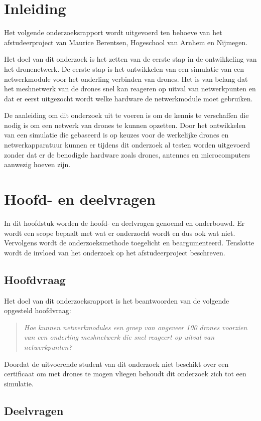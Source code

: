 \documentclass[a4paper, 11pt, oneside]{report}
\begin{document}
\chapter{Inleiding}
\label{chapter:inleiding}


Het volgende onderzoeksrapport wordt uitgevoerd ten behoeve van het afstudeerproject van Maurice Berentsen, Hogeschool van Arnhem en Nijmegen.

Het doel van dit onderzoek is het zetten van de eerste stap in de ontwikkeling van het dronenetwerk.
De eerste stap is het ontwikkelen van een simulatie van een netwerkmodule voor het onderling verbinden van drones.
Het is van belang dat het meshnetwerk van de drones snel kan reageren op uitval van netwerkpunten en dat er eerst uitgezocht wordt welke hardware de netwerkmodule moet gebruiken.

De aanleiding om dit onderzoek uit te voeren is om de kennis te verschaffen die nodig is om een netwerk van drones te kunnen opzetten.
Door het ontwikkelen van een simulatie die gebaseerd is op keuzes voor de werkelijke drones en netwerkapparatuur kunnen er tijdens dit onderzoek al testen worden uitgevoerd zonder dat er de benodigde hardware zoals drones, antennes en microcomputers aanwezig hoeven zijn. 


\chapter{Hoofd- en deelvragen}
In dit hoofdstuk worden de hoofd- en deelvragen genoemd en onderbouwd.
Er wordt een scope bepaalt met wat er onderzocht wordt en dus ook wat niet.
Vervolgens wordt de onderzoeksmethode toegelicht en beargumenteerd.
Tenslotte wordt de invloed van het onderzoek op het afstudeerproject beschreven.

\section{Hoofdvraag}
Het doel van dit onderzoeksrapport is het beantwoorden van de volgende opgesteld hoofdvraag:
\begin{quotation}
\textit{Hoe kunnen netwerkmodules een groep van ongeveer 100 drones voorzien van een onderling meshnetwerk die snel reageert op uitval van netwerkpunten?}	
\end{quotation}
Doordat de uitvoerende student van dit onderzoek niet beschikt over een certificaat om met drones te mogen vliegen behoudt dit onderzoek zich tot een simulatie.


\section{Deelvragen}
\end{document}
